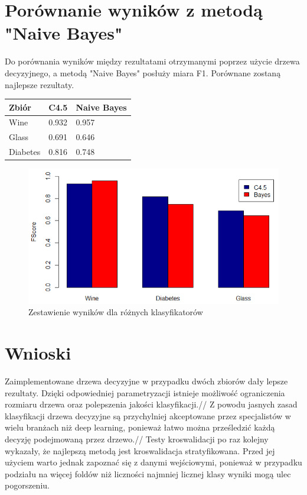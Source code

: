 \documentclass[12pt,a4paper]{article}
\begin{document}
\section{Porównanie wyników z metodą "Naive Bayes"}
Do porównania wyników między rezultatami otrzymanymi poprzez użycie drzewa decyzyjnego, a metodą "Naive Bayes" posłuży miara F1. Porównane zostaną najlepsze rezultaty.

\vspace{5mm}
\begin{tabular}{ |p{3cm}||p{3cm}|p{3cm}|}
\hline
Zbiór &C4.5 &Naive Bayes\\
\hline
Wine &0.932 &0.957\\
Glass &0.691 &0.646\\
Diabetes &0.816 &0.748\\
\hline
\end{tabular}
\vspace{5mm}

\begin{figure}[H]
\centering
\includegraphics[width=1\textwidth]{c4_5vsBayes.PNG}
\caption{Zestawienie wyników dla różnych klasyfikatorów}
\end{figure}

\section{Wnioski}
Zaimplementowane drzewa decyzyjne w przypadku dwóch zbiorów dały lepsze rezultaty. Dzięki odpowiedniej parametryzacji istnieje możliwość ograniczenia rozmiaru drzewa oraz polepszenia jakości klasyfikacji.//
Z powodu jasnych zasad klasyfikacji drzewa decyzyjne są przychylniej akceptowane przez specjalistów w wielu branżach niż deep learning, ponieważ łatwo można prześledzić każdą decyzję podejmowaną przez drzewo.//
Testy kroswalidacji po raz kolejny wykazały, że najlepszą metodą jest kroswalidacja stratyfikowana. Przed jej użyciem warto jednak zapoznać się z danymi wejściowymi, ponieważ w przypadku podziału na więcej foldów niż liczności najmniej licznej klasy wyniki mogą ulec pogorszeniu.
\end{document}
